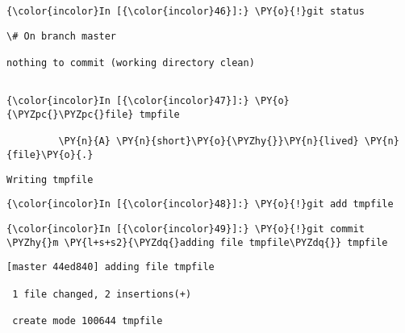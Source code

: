     \begin{Verbatim}[commandchars=\\\{\}]
{\color{incolor}In [{\color{incolor}46}]:} \PY{o}{!}git status
\end{Verbatim}

    \begin{Verbatim}[commandchars=\\\{\}]
\# On branch master

nothing to commit (working directory clean)


    \end{Verbatim}





    \begin{Verbatim}[commandchars=\\\{\}]
{\color{incolor}In [{\color{incolor}47}]:} \PY{o}{\PYZpc{}\PYZpc{}file} tmpfile
         
         \PY{n}{A} \PY{n}{short}\PY{o}{\PYZhy{}}\PY{n}{lived} \PY{n}{file}\PY{o}{.}
\end{Verbatim}

    \begin{Verbatim}[commandchars=\\\{\}]
Writing tmpfile

    \end{Verbatim}



    \begin{Verbatim}[commandchars=\\\{\}]
{\color{incolor}In [{\color{incolor}48}]:} \PY{o}{!}git add tmpfile
\end{Verbatim}

    \begin{Verbatim}[commandchars=\\\{\}]
{\color{incolor}In [{\color{incolor}49}]:} \PY{o}{!}git commit \PYZhy{}m \PY{l+s+s2}{\PYZdq{}adding file tmpfile\PYZdq{}} tmpfile 
\end{Verbatim}

    \begin{Verbatim}[commandchars=\\\{\}]
[master 44ed840] adding file tmpfile

 1 file changed, 2 insertions(+)

 create mode 100644 tmpfile


    \end{Verbatim}



